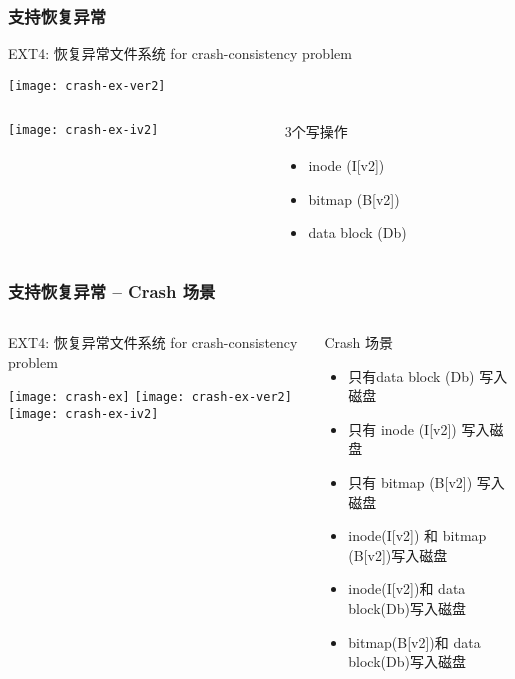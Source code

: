 \begin{frame}[fragile]
	\frametitle{支持恢复异常}
	EXT4: 恢复异常文件系统 for crash-consistency problem
	
	\centering
	\texttt{[image: crash-ex-ver2]}
	
	
		\begin{columns}
		\begin{column}{.5\textwidth}
			
		
			\centering
	\texttt{[image: crash-ex-iv2]}
			
		\end{column}
		\pause
		\begin{column}{.5\textwidth}			
		3个写操作
		\begin{itemize}
	\item inode (I[v2]) 
	\item bitmap (B[v2])
	\item data block (Db)
\end{itemize}
			
		\end{column}
	\end{columns}
	
\end{frame}



\begin{frame}[fragile]
	\frametitle{支持恢复异常 -- Crash 场景}
	\begin{columns}
	\begin{column}{.4\textwidth}
	EXT4: 恢复异常文件系统 for crash-consistency problem
	
	\centering
	\texttt{[image: crash-ex]}
	\texttt{[image: crash-ex-ver2]}
	\texttt{[image: crash-ex-iv2]}	
	\end{column}
	\pause
	\begin{column}{.6\textwidth}			
			Crash 场景
			\begin{itemize}
				\item 只有data block (Db) 写入磁盘
				\item 只有 inode (I[v2])  写入磁盘
				\item 只有 bitmap (B[v2])  写入磁盘
				\pause
				\item inode(I[v2]) 和 bitmap (B[v2])写入磁盘
				\item inode(I[v2])和 data block(Db)写入磁盘
				\item bitmap(B[v2])和 data block(Db)写入磁盘
			\end{itemize}
			
		\end{column}
	\end{columns}
	
\end{frame}



